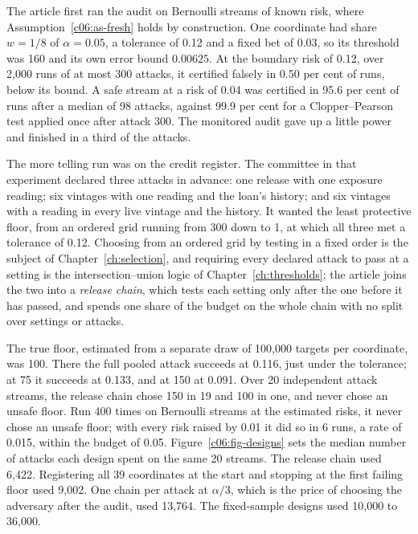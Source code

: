 The article first ran the audit on Bernoulli streams of known risk, where
Assumption~\ref{c06:as-fresh} holds by construction. One coordinate had share
$w = 1/8$ of $\alpha = 0.05$, a tolerance of 0.12 and a fixed bet of 0.03, so its
threshold was 160 and its own error bound $0.00625$. At the boundary risk of 0.12,
over 2,000 runs of at most 300 attacks, it certified falsely in 0.50 per cent of
runs, below its bound. A safe stream at a risk of 0.04 was certified in 95.6 per cent
of runs after a median of 98 attacks, against 99.9 per cent for a Clopper--Pearson
test applied once after attack 300.
The monitored audit gave up a little power and finished in a third of the attacks.

The more telling run was on the credit register. The committee in that experiment
declared three attacks in advance: one release with one exposure reading; six
vintages with one reading and the loan's history; and six vintages with a reading
in every live vintage and the history. It wanted the least protective floor, from
an ordered grid running from 300 down to 1, at which all three met a tolerance of
0.12. Choosing from an ordered grid by testing in a fixed order is the subject of
Chapter~\ref{ch:selection}, and requiring every declared attack to pass at a setting
is the intersection--union logic of Chapter~\ref{ch:thresholds}; the article joins
the two into a \emph{release chain}, which tests each setting only after the one
before it has passed, and spends one share of the budget on the whole chain with no
split over settings or attacks.

The true floor, estimated from a separate draw of 100,000 targets per coordinate,
was 100. There the full pooled attack succeeds at 0.116, just under the tolerance;
at 75 it succeeds at 0.133, and at 150 at 0.091.
Over 20 independent attack streams, the release chain chose 150 in 19 and 100 in
one, and never chose an unsafe floor. Run 400 times on Bernoulli streams at the
estimated risks, it never chose an unsafe floor; with every risk raised by 0.01 it
did so in 6 runs, a rate of 0.015, within the budget of 0.05.
Figure~\ref{c06:fig-designs} sets the median number of attacks each design spent
on the same 20 streams. The release chain used 6,422. Registering all 39
coordinates at the start and stopping at the first failing floor used 9,002. One
chain per attack at $\alpha/3$, which is the price of choosing the adversary after
the audit, used 13,764. The fixed-sample designs used 10,000 to 36,000.

